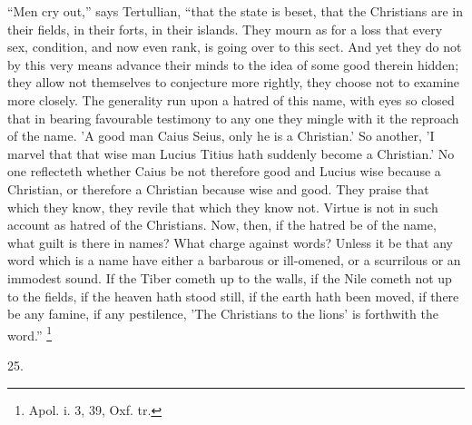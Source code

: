 ``Men cry out,'' says Tertullian, ``that
the state is beset, that the Christians are in their
fields, in their forts, in their islands. They mourn as
for a loss that every sex, condition, and now even rank,
is going over to this sect. And yet they do not by this
very means advance their minds to the idea of some good
therein hidden; they allow not themselves to conjecture
more rightly, they choose not to examine more closely.
The generality run upon a hatred of this name, with eyes
so closed that in bearing favourable testimony to any one
they mingle with it the reproach of the name. 'A good man
Caius Seius, only he is a Christian.' So another, 'I
marvel that that wise man Lucius Titius hath suddenly
become a Christian.' No one reflecteth whether Caius be
not therefore good and Lucius wise because a Christian,
or therefore a Christian because wise and good. They
praise that which they know, they revile that which they
know not. Virtue is not in such account as hatred of the
Christians. Now, then, if the hatred be of the name, what
guilt is there in names? What charge against words?
Unless it be that any word which is a name have either a
barbarous or ill-omened, or a scurrilous or an immodest
sound. If the Tiber cometh up to the walls, if the Nile
cometh not up to the fields, if the heaven hath stood
still, if the earth hath been moved, if there be any
famine, if any pestilence, 'The Christians to the lions'
is forthwith the word.'' \footnote{Apol. i. 3, 39, Oxf. tr.}

25.


